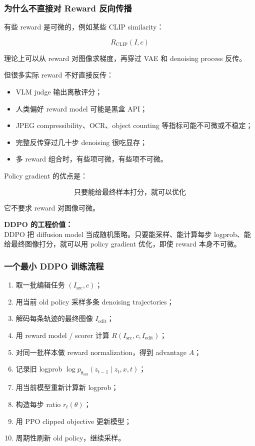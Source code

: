 \subsubsection{为什么不直接对 Reward 反向传播}

有些 reward 是可微的，例如某些 CLIP similarity：

\[
R_\text{CLIP}(I,c)
\]

理论上可以从 reward 对图像求梯度，再穿过 VAE 和 denoising process 反传。

但很多实际 reward 不好直接反传：

\begin{itemize}[leftmargin=1.5em]
  \item VLM judge 输出离散评分；
  \item 人类偏好 reward model 可能是黑盒 API；
  \item JPEG compressibility、OCR、object counting 等指标可能不可微或不稳定；
  \item 完整反传穿过几十步 denoising 很吃显存；
  \item 多 reward 组合时，有些项可微，有些项不可微。
\end{itemize}

Policy gradient 的优点是：

\[
\text{只要能给最终样本打分，就可以优化}
\]

它不要求 reward 对图像可微。

\begin{summarybox}
\textbf{DDPO 的工程价值：}\\
DDPO 把 diffusion model 当成随机策略。只要能采样、能计算每步 logprob、能给最终图像打分，就可以用 policy gradient 优化，即使 reward 本身不可微。
\end{summarybox}

\subsubsection{一个最小 DDPO 训练流程}

\begin{enumerate}[leftmargin=1.5em]
  \item 取一批编辑任务 $(I_\text{src},c)$；
  \item 用当前 old policy 采样多条 denoising trajectories；
  \item 解码每条轨迹的最终图像 $I_\text{edit}$；
  \item 用 reward model / scorer 计算 $R(I_\text{src},c,I_\text{edit})$；
  \item 对同一批样本做 reward normalization，得到 advantage $A$；
  \item 记录旧 logprob $\log p_{\theta_\text{old}}(z_{t-1}\mid z_t,x,t)$；
  \item 用当前模型重新计算新 logprob；
  \item 构造每步 ratio $r_t(\theta)$；
  \item 用 PPO clipped objective 更新模型；
  \item 周期性刷新 old policy，继续采样。
\end{enumerate}

